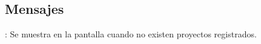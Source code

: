 \subsection{Mensajes}

\begin{Citemize}
	\item {}: Se muestra en la pantalla  cuando no existen proyectos registrados.
\end{Citemize}
